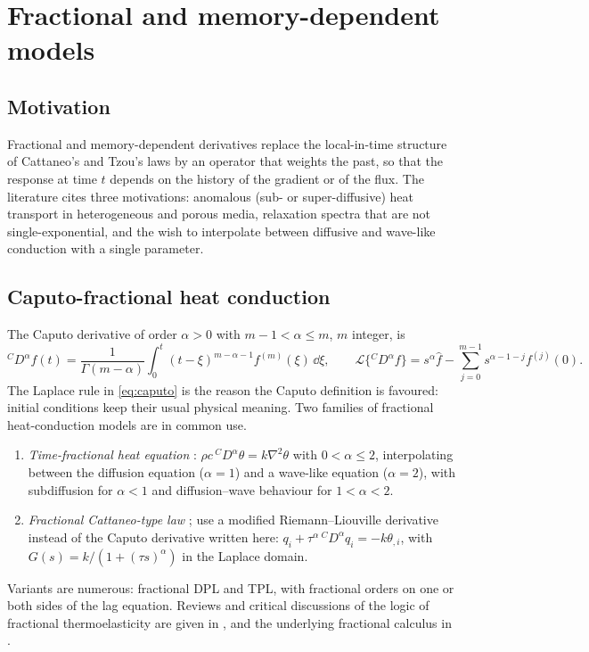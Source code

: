 \section{Fractional and memory-dependent models}\label{sec:memory}
\subsection{Motivation}
Fractional and memory-dependent derivatives replace the local-in-time structure of Cattaneo's and Tzou's laws by an operator that weights the past, so that the response at time $t$ depends on the history of the gradient or of the flux. The literature cites three motivations: anomalous (sub- or super-diffusive) heat transport in heterogeneous and porous media, relaxation spectra that are not single-exponential, and the wish to interpolate between diffusive and wave-like conduction with a single parameter.

\subsection{Caputo-fractional heat conduction}
The Caputo derivative of order $\alpha>0$ with $m-1<\alpha\le m$, $m$ integer, is \citep{Caputo1967,Podlubny1999}
\begin{equation}
{}^C\!D^\alpha f(t)=\frac1{\Gamma(m-\alpha)}\int_0^t(t-\xi)^{m-\alpha-1}f^{(m)}(\xi)\,\dd\xi,\qquad
\mathcal L\{{}^C\!D^\alpha f\}=s^\alpha\hat f-\sum_{j=0}^{m-1}s^{\alpha-1-j}f^{(j)}(0).\label{eq:caputo}
\end{equation}
The Laplace rule in \eqref{eq:caputo} is the reason the Caputo definition is favoured: initial conditions keep their usual physical meaning. Two families of fractional heat-conduction models are in common use.
\begin{enumerate}
\item \emph{Time-fractional heat equation} \citep{Povstenko2004,Povstenko2007,Povstenko2009}: $\rho c\,{}^C\!D^\alpha\theta=k\nabla^2\theta$ with $0<\alpha\le2$, interpolating between the diffusion equation ($\alpha=1$) and a wave-like equation ($\alpha=2$), with subdiffusion for $\alpha<1$ and diffusion--wave behaviour for $1<\alpha<2$.
\item \emph{Fractional Cattaneo-type law} \citep{Povstenko2011Cattaneo,Sherief2010Fractional}; \citet{Ezzat2011} use a modified Riemann--Liouville derivative instead of the Caputo derivative written here: $q_i+\tau^\alpha\,{}^C\!D^\alpha q_i=-k\theta_{,i}$, with $G(s)=k/(1+(\tau s)^\alpha)$ in the Laplace domain.
\end{enumerate}
Variants are numerous: fractional DPL and TPL, with fractional orders on one or both sides of the lag equation. Reviews and critical discussions of the logic of fractional thermoelasticity are given in \citep{Povstenko2016,Yu2024,Povstenko2004,Povstenko2007,Povstenko2009}, and the underlying fractional calculus in \citep{Gorenflo1997}.

